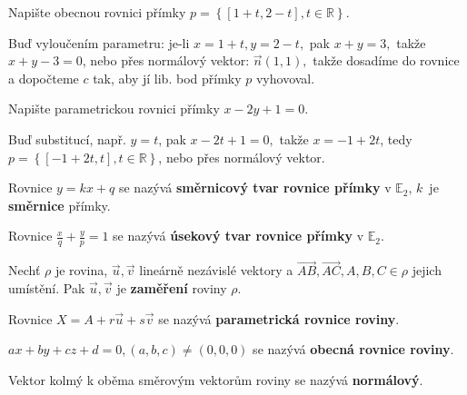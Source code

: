 \begin{priklad}
Napište obecnou rovnici přímky $p=\left \{ [1+t,2-t], t \in \mathbb R \right \} .$
\end{priklad}

\begin{reseni}
Buď vyloučením parametru: je-li $x=1+t, y= 2-t,$ pak $x+y=3,$ takže $x+y-3=0$, nebo
přes normálový vektor: $\vec n(1,1),$ takže dosadíme do rovnice a dopočteme $c$ tak,
aby jí lib. bod přímky $p$ vyhovoval.
\end{reseni}

\begin{priklad}
Napište parametrickou rovnici přímky $x-2y+1=0.$
\end{priklad}

\begin{reseni}
Buď substitucí, např. $y=t$, pak $x-2t+1=0,$ takže $x=-1+2t$, tedy $p=\left \{ [-1+2t,t], t \in \mathbb R \right \}$,
nebo přes normálový vektor.
\end{reseni}

\begin{definition}
    Rovnice $y=kx+q$ se nazývá \textbf{směrnicový tvar rovnice přímky} v $\mathbb E_2$,
    $k$~je \textbf{směrnice} přímky.
\end{definition}

\begin{definition}
Rovnice $\frac{x}{q}+\frac{y}{p}=1$ se nazývá \textbf{úsekový tvar rovnice přímky} v $\mathbb E_2$.
\end{definition}

\begin{definition}
Nechť $\rho$ je rovina, $\vec u, \vec v$ lineárně nezávislé vektory a $\overrightarrow{AB},
\overrightarrow{AC}, A,B,C\in \rho$ jejich umístění. Pak $\vec u, \vec v$ je
\textbf{zaměření} roviny $\rho.$
\end{definition}

\begin{definition}
    Rovnice $X=A+r\vec u+s\vec v$ se nazývá \textbf{parametrická rovnice roviny}.
\end{definition}

\begin{definition}
    $ax+by+cz+d=0, (a,b,c)\ne(0,0,0)$ se nazývá \textbf{obecná rovnice roviny}.
\end{definition}

\begin{definition}
    Vektor kolmý k oběma směrovým vektorům roviny se nazývá \textbf{normálový}.
\end{definition}


